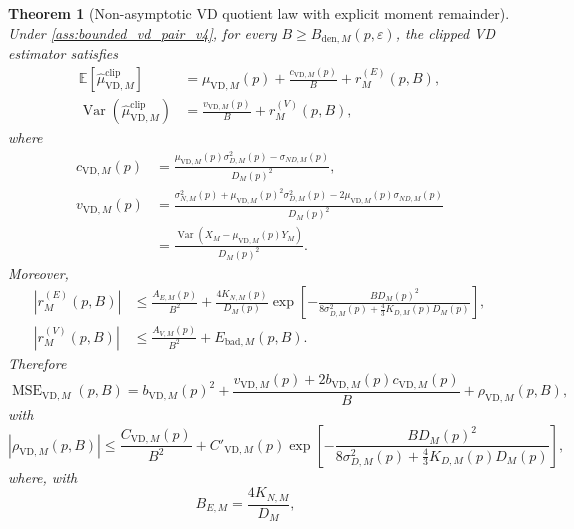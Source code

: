 \documentclass[11pt]{article}
\newtheorem{theorem}{Theorem}
\newcommand{\MSE}{\operatorname{MSE}}
\newcommand{\Var}{\operatorname{Var}}
\newcommand{\E}{\mathbb{E}}
\newcommand{\1}{\mathbf{1}}
\newcommand{\abs}[1]{\left\lvert #1 \right\rvert}
\begin{document}
\begin{theorem}[Non-asymptotic VD quotient law with explicit moment remainder]
\label{thm:vd_quotient_certified_v4}
Under \cref{ass:bounded_vd_pair_v4}, for every \(B\geq B_{\mathrm{den},M}(p,\varepsilon)\), the clipped VD estimator satisfies
\begin{align}
    \E[\widehat\mu_{\mathrm{VD},M}^{\mathrm{clip}}]
    &=\mu_{\mathrm{VD},M}(p)+\frac{c_{\mathrm{VD},M}(p)}{B}+r^{(E)}_{M}(p,B),
    \label{eq:vd_expectation_certified_v4}\\
    \Var(\widehat\mu_{\mathrm{VD},M}^{\mathrm{clip}})
    &=\frac{v_{\mathrm{VD},M}(p)}{B}+r^{(V)}_{M}(p,B),
    \label{eq:vd_variance_certified_v4}
\end{align}
where
\begin{align}
    c_{\mathrm{VD},M}(p)
    &=\frac{\mu_{\mathrm{VD},M}(p)\sigma_{D,M}^2(p)-\sigma_{ND,M}(p)}{D_M(p)^2},
    \label{eq:vd_c_v4}\\
    v_{\mathrm{VD},M}(p)
    &=\frac{\sigma_{N,M}^2(p)+\mu_{\mathrm{VD},M}(p)^2\sigma_{D,M}^2(p)
    -2\mu_{\mathrm{VD},M}(p)\sigma_{ND,M}(p)}{D_M(p)^2}
    \label{eq:vd_v_v4}\\
    &=\frac{\Var(X_M-\mu_{\mathrm{VD},M}(p)Y_M)}{D_M(p)^2}.
\end{align}
Moreover,
\begin{align}
    \abs{r^{(E)}_{M}(p,B)}
    &\leq \frac{A_{E,M}(p)}{B^2}+\frac{4K_{N,M}(p)}{D_M(p)}
    \exp\!\left[-\frac{B D_M(p)^2}{8\sigma_{D,M}^2(p)+\frac{4}{3}K_{D,M}(p)D_M(p)}\right],
    \label{eq:explicit_E_remainder_v4}\\
    \abs{r^{(V)}_{M}(p,B)}
    &\leq \frac{A_{V,M}(p)}{B^2}+E_{\mathrm{bad},M}(p,B).
    \label{eq:explicit_V_remainder_v4}
\end{align}
Therefore
\begin{equation}
    \MSE_{\mathrm{VD},M}(p,B)
    =b_{\mathrm{VD},M}(p)^2
    +\frac{v_{\mathrm{VD},M}(p)+2b_{\mathrm{VD},M}(p)c_{\mathrm{VD},M}(p)}{B}
    +\rho_{\mathrm{VD},M}(p,B),
    \label{eq:vd_mse_certified_v4}
\end{equation}
with
\begin{equation}
    \abs{\rho_{\mathrm{VD},M}(p,B)}
    \leq
    \frac{C_{\mathrm{VD},M}(p)}{B^2}
    +C'_{\mathrm{VD},M}(p)
    \exp\!\left[-\frac{B D_M(p)^2}{8\sigma_{D,M}^2(p)+\frac{4}{3}K_{D,M}(p)D_M(p)}\right],
    \label{eq:vd_mse_remainder_v4}
\end{equation}
where, with
\begin{equation}
    B_{E,M}=\frac{4K_{N,M}}{D_M},
    \qquad

\end{equation}
\end{theorem}
\end{document}
